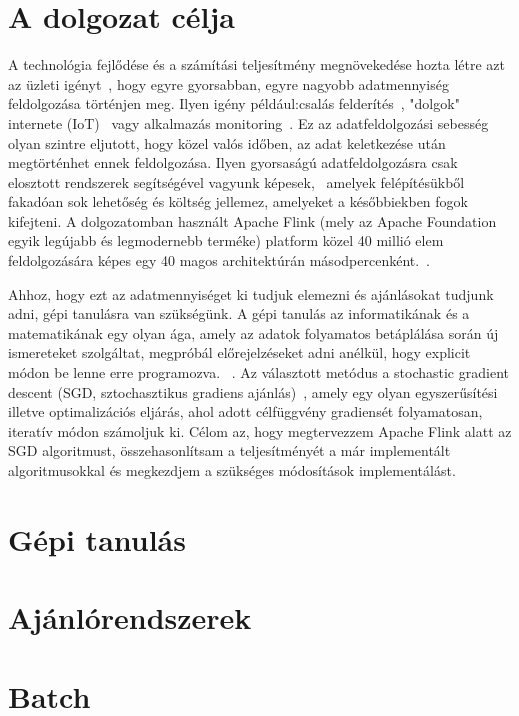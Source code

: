 \documentclass[a4paper,12pt]{article}
\begin{document}
\section{A dolgozat célja}

A technológia fejlődése és a számítási teljesítmény megnövekedése hozta létre azt az üzleti igényt~\cite{rta}, hogy egyre gyorsabban, egyre nagyobb adatmennyiség feldolgozása történjen meg. Ilyen igény például:csalás felderítés~\cite{fraud}, "dolgok" internete (IoT)~\cite{iot} vagy alkalmazás monitoring~\cite{ganalitycs}. Ez az adatfeldolgozási sebesség olyan szintre eljutott, hogy közel valós időben, az adat keletkezése után megtörténhet ennek feldolgozása. Ilyen gyorsaságú adatfeldolgozásra csak elosztott rendszerek segítségével vagyunk képesek,~\cite{ucl} amelyek felépítésükből fakadóan sok lehetőség és költség jellemez, amelyeket a későbbiekben fogok kifejteni. A dolgozatomban használt Apache Flink (mely az Apache Foundation egyik legújabb és legmodernebb terméke) platform közel 40 millió elem feldolgozására képes egy 40 magos architektúrán másodpercenként.~\cite{flink}.  \linebreak

Ahhoz, hogy ezt az adatmennyiséget ki tudjuk elemezni és ajánlásokat tudjunk adni, gépi tanulásra van szükségünk. A gépi tanulás az informatikának és a matematikának egy olyan ága, amely az adatok folyamatos betáplálása során új ismereteket szolgáltat, megpróbál előrejelzéseket adni anélkül, hogy explicit módon be lenne erre programozva. ~\cite{ml}. Az választott metódus a stochastic gradient descent (SGD, sztochasztikus gradiens ajánlás)~\cite{sgd}, amely egy olyan egyszerűsítési illetve optimalizációs eljárás, ahol adott célfüggvény gradiensét folyamatosan, iteratív módon számoljuk ki. Célom az, hogy megtervezzem Apache Flink alatt az SGD algoritmust, összehasonlítsam a teljesítményét a már implementált algoritmusokkal és megkezdjem a szükséges módosítások implementálást.

\section{Gépi tanulás}

\section{Ajánlórendszerek}

\section{Batch}
\end{document}
